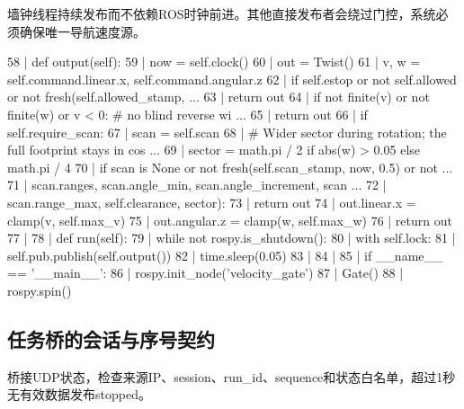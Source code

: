 墙钟线程持续发布而不依赖ROS时钟前进。其他直接发布者会绕过门控，系统必须确保唯一导航速度源。
\begin{CodeBlock}
  58 |     def output(self):
  59 |         now = self.clock()
  60 |         out = Twist()
  61 |         v, w = self.command.linear.x, self.command.angular.z
  62 |         if self.estop or not self.allowed or not fresh(self.allowed_stamp,  ...
  63 |             return out
  64 |         if not finite(v) or not finite(w) or v < 0:  # no blind reverse wi  ...
  65 |             return out
  66 |         if self.require_scan:
  67 |             scan = self.scan
  68 |             # Wider sector during rotation; the full footprint stays in cos ...
  69 |             sector = math.pi / 2 if abs(w) > 0.05 else math.pi / 4
  70 |             if scan is None or not fresh(self.scan_stamp, now, 0.5) or not  ...
  71 |                     scan.ranges, scan.angle_min, scan.angle_increment, scan ...
  72 |                     scan.range_max, self.clearance, sector):
  73 |                 return out
  74 |         out.linear.x = clamp(v, self.max_v)
  75 |         out.angular.z = clamp(w, self.max_w)
  76 |         return out
  77 | 
  78 |     def run(self):
  79 |         while not rospy.is_shutdown():
  80 |             with self.lock:
  81 |                 self.pub.publish(self.output())
  82 |             time.sleep(0.05)
  83 | 
  84 | 
  85 | if __name__ == '__main__':
  86 |     rospy.init_node('velocity_gate')
  87 |     Gate()
  88 |     rospy.spin()
\end{CodeBlock}
\subsection{任务桥的会话与序号契约}
桥接UDP状态，检查来源IP、session、run\_id、sequence和状态白名单，超过1秒无有效数据发布stopped。


